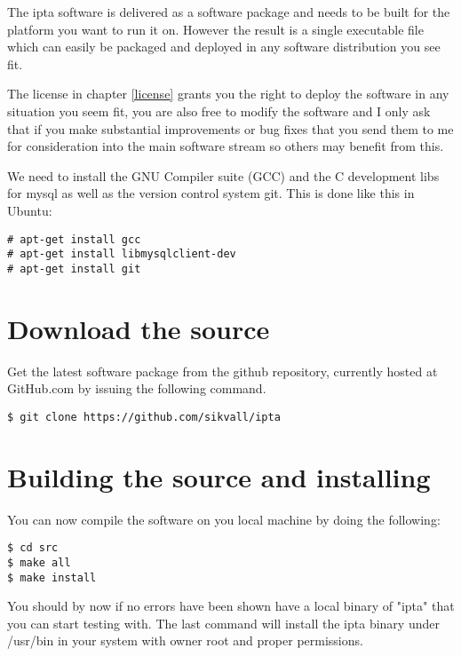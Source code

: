 \documentclass[english,twoside,openright,a4paper,12pt]{report}
\begin{document}
The ipta software is delivered as a software package and needs to be built for the platform you want to run it on. However the result is a single executable file which can easily be packaged and deployed in any software distribution you see fit. 

The license in chapter \ref{license} grants you the right to deploy the software in any situation you seem fit, you are also free to modify the software and I only ask that if you make substantial improvements or bug fixes that you send them to me for consideration into the main software stream so others may benefit from this.

We need to install the GNU Compiler suite (GCC) and the C development libs for mysql as well as the version control system git. This is done like this in Ubuntu:

\begin{verbatim}
# apt-get install gcc
# apt-get install libmysqlclient-dev
# apt-get install git
\end{verbatim}

\section{Download the source}

Get the latest software package from the github repository, currently hosted at GitHub.com by issuing the following command.

\begin{verbatim}
$ git clone https://github.com/sikvall/ipta
\end{verbatim}

\section{Building the source and installing}

You can now compile the software on you local machine by doing the following:

\begin{verbatim}
$ cd src
$ make all
$ make install
\end{verbatim}

You should by now if no errors have been shown have a local binary of "ipta" that you can start testing with. The last command will install the ipta binary under /usr/bin in your system with owner root and proper permissions.
\end{document}
